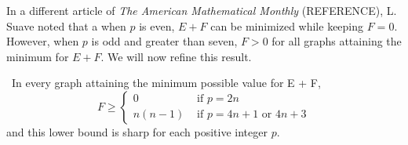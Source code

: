 \documentclass[10pt]{amsart}
\begin{document}
In a different article of \emph{The American Mathematical Monthly} (REFERENCE),
L. Suave noted that a when $p$ is even, $E + F$ can be minimized while keeping $F = 0$. However, 
when $p$ is odd and greater than seven, $F > 0$ for all graphs attaining the minimum for $E + F$.
We will now refine this result.

\begin{theorem} \
    In every graph attaining the minimum possible value for E + F,
    \begin{equation}
        F \geq \begin{cases}
                    0 & \text{ if } p = 2n \\
                    n(n - 1) & \text{ if } p = 4n + 1 \text{ or } 4n + 3
                \end{cases} \label{eq:theorem2}
    \end{equation}
    and this lower bound is sharp for each positive integer $p$.
\end{theorem}

\end{document}
